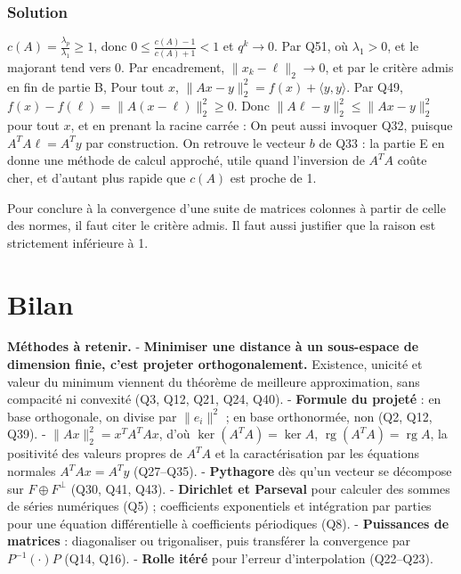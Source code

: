\documentclass[11pt,a4paper]{article}
\newcommand{\equationajustee}[1]{%
  \sbox{\boiteequation}{$\displaystyle #1$}%
  \ifdim\wd\boiteequation>\linewidth
    \[\resizebox{\linewidth}{!}{\usebox{\boiteequation}}\]%
  \else
    \[#1\]%
  \fi}
\begin{document}
\hypertarget{solution-51}{%
\subsubsection{Solution}\label{solution-51}}

\(c(A)=\frac{\lambda_p}{\lambda_1}\geqslant1\), donc \(0\leqslant\frac{c(A)-1}{c(A)+1}<1\) et \(q^k\to0\). Par Q51, où \(\lambda_1>0\),
\equationajustee{0\leqslant\|x_k-\ell\|_2^2\leqslant\frac{f(x_0)-f(\ell)}{\lambda_1}q^k,}
et le majorant tend vers 0. Par encadrement, \(\|x_k-\ell\|_2\to0\), et par le critère admis en fin de partie B,
\equationajustee{\boxed{\lim_{k\to+\infty}x_k=\ell.}}
Pour tout \(x\), \(\|Ax-y\|_2^2=f(x)+\langle y,y\rangle\). Par Q49, \(f(x)-f(\ell)=\|A(x-\ell)\|_2^2\geqslant0\). Donc \(\|A\ell-y\|_2^2\leqslant\|Ax-y\|_2^2\) pour tout \(x\), et en prenant la racine carrée :
\equationajustee{\boxed{\|A\ell-y\|_2=\min_{x\in\mathcal M_{p,1}(\mathbb R)}\|Ax-y\|_2.}}
On peut aussi invoquer Q32, puisque \(A^TA\ell=A^Ty\) par construction. On retrouve le vecteur \(b\) de Q33 : la partie E en donne une méthode de calcul approché, utile quand l'inversion de \(A^TA\) coûte cher, et d'autant plus rapide que \(c(A)\) est proche de 1.

\begin{jury}

Pour conclure à la convergence d'une suite de matrices colonnes à partir de celle des normes, il faut citer le critère admis. Il faut aussi justifier que la raison est strictement inférieure à 1.

\end{jury}

\hypertarget{bilan}{%
\section{Bilan}\label{bilan}}

\textbf{Méthodes à retenir.}
- \textbf{Minimiser une distance à un sous-espace de dimension finie, c'est projeter orthogonalement.} Existence, unicité et valeur du minimum viennent du théorème de meilleure approximation, sans compacité ni convexité (Q3, Q12, Q21, Q24, Q40).
- \textbf{Formule du projeté} : en base orthogonale, on divise par \(\|e_i\|^2\) ; en base orthonormée, non (Q2, Q12, Q39).
- \textbf{\(\|Ax\|_2^2=x^TA^TAx\)}, d'où \(\ker(A^TA)=\ker A\), \(\operatorname{rg}(A^TA)=\operatorname{rg}A\), la positivité des valeurs propres de \(A^TA\) et la caractérisation par les équations normales \(A^TAx=A^Ty\) (Q27--Q35).
- \textbf{Pythagore} dès qu'un vecteur se décompose sur \(F\oplus F^\perp\) (Q30, Q41, Q43).
- \textbf{Dirichlet et Parseval} pour calculer des sommes de séries numériques (Q5) ; coefficients exponentiels et intégration par parties pour une équation différentielle à coefficients périodiques (Q8).
- \textbf{Puissances de matrices} : diagonaliser ou trigonaliser, puis transférer la convergence par \(P^{-1}(\cdot)P\) (Q14, Q16).
- \textbf{Rolle itéré} pour l'erreur d'interpolation (Q22--Q23).
\end{document}
